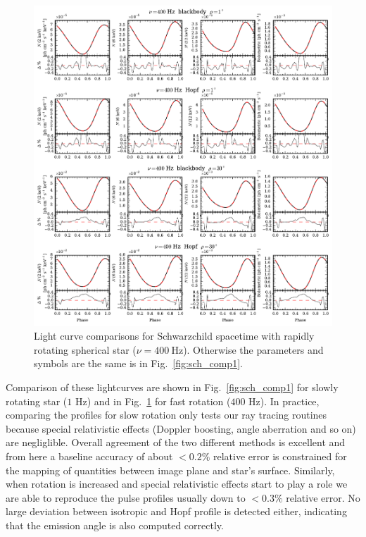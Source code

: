 \documentclass[iop, usenatbib]{emulateapj}
\begin{document}
\begin{figure}
\centering
\includegraphics[width=18cm]{figs/fig2b.pdf}
\caption{\label{fig:sch_comp400}
  Light curve comparisons for Schwarzchild spacetime with rapidly rotating spherical star ($\nu = 400~\mathrm{Hz}$).
  Otherwise the parameters and symbols are the same is in Fig.~\ref{fig:sch_comp1}.
}
\end{figure}


Comparison of these lightcurves are shown in Fig.~\ref{fig:sch_comp1} for slowly rotating star ($1$ Hz) and in Fig.~\ref{fig:sch_comp400} for fast rotation ($400$ Hz).
In practice, comparing the profiles for slow rotation only tests our ray tracing routines because special relativistic effects (Doppler boosting, angle aberration and so on) are negliglible.
Overall agreement of the two different methods is excellent and from here a baseline accuracy of about $<0.2\%$ relative error is constrained for the mapping of quantities between image plane and star's surface.
Similarly, when rotation is increased and special relativistic effects start to play a role we are able to reproduce the pulse profiles usually down to $<0.3\%$ relative error.
No large deviation between isotropic and Hopf profile is detected either, indicating that the emission angle is also computed correctly.
\end{document}
